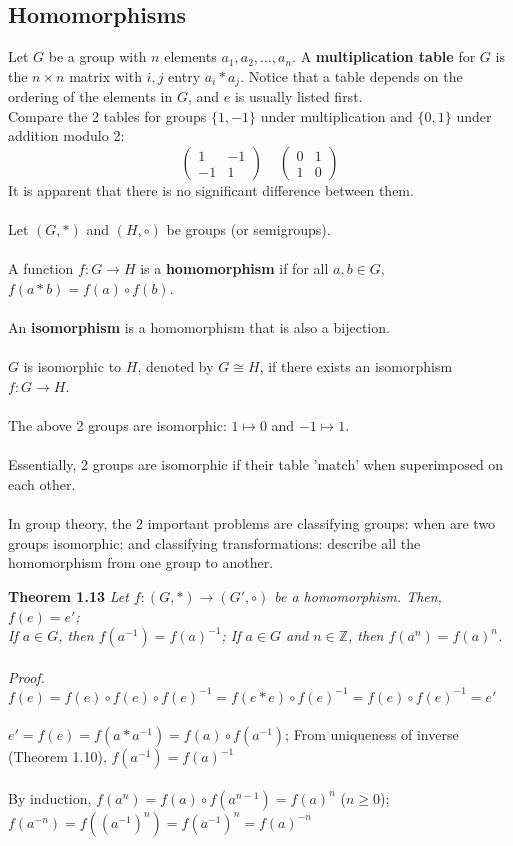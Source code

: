 \documentclass{article}
\begin{document}
\subsection{Homomorphisms}
Let \(G\) be a group with \(n\) elements \(a_{1},a_{2},...,a_{n}\). A \textbf{multiplication table} for \(G\) is the \(n\times n\) matrix with \(i,j\) entry \(a_{i}*a_{j}\).
Notice that a table depends on the ordering of the elements in \(G\), and \(e\) is usually listed first.\\
Compare the 2 tables for groups \(\{1,-1\}\) under multiplication and \(\{0,1\}\) under addition modulo 2:
\[\begin{pmatrix}1&-1\\-1&1\end{pmatrix}\;\;\;\;\begin{pmatrix} 0&1\\1&0\end{pmatrix}\]
It is apparent that there is no significant difference between them.\\\\
Let \((G,*)\) and \((H,\circ)\) be groups (or semigroups).\\\\
A function \(f:G\to H\) is a \textbf{homomorphism} if for all \(a,b\in G\), \(f(a*b)=f(a)\circ f(b)\).\\\\
An \textbf{isomorphism} is a homomorphism that is also a bijection.\\\\
\(G\) is isomorphic to \(H\), denoted by \(G\cong H\), if there exists an isomorphism \(f:G\to H\).\\\\
The above 2 groups are isomorphic: \(1\mapsto 0\) and \(-1\mapsto 1\).\\\\
Essentially, 2 groups are isomorphic if their table 'match' when superimposed on each other.\\\\
In group theory, the 2 important problems are classifying groups: when are two groups isomorphic; and classifying transformations: describe all the homomorphism from one group to another.
\begin{redrules}\color{red}
\textbf{Theorem 1.13} \textit{Let \(f:(G,*)\to(G',\circ)\) be a homomorphism. Then, \(f(e)=e'\);\\
If \(a\in G\), then \(f(a^{-1})=f(a)^{-1}\); If \(a\in G\) and \(n\in\mathbb{Z}\), then \(f(a^{n})=f(a)^{n}\).}\\\\\color{black}
\textit{Proof.} \(f(e)=f(e)\circ f(e)\circ f(e)^{-1}=f(e*e)\circ f(e)^{-1}=f(e)\circ f(e)^{-1}=e'\)\\\\
\(e'=f(e)=f(a*a^{-1})=f(a)\circ f(a^{-1})\); From uniqueness of inverse \color{gray} (Theorem 1.10)\color{black}, \(f(a^{-1})=f(a)^{-1}\)\\\\
By induction, \(f(a^{n})=f(a)\circ f(a^{n-1})=f(a)^{n}\) (\(n\ge 0\)); \(f(a^{-n})=f((a^{-1})^{n})=f(a^{-1})^{n}=f(a)^{-n}\)
\end{redrules}
\end{document}
